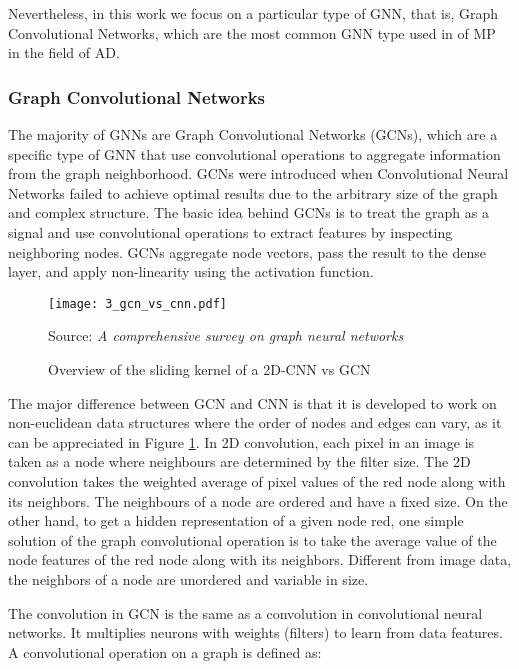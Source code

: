 Nevertheless, in this work we focus on a particular type of GNN, that is, Graph Convolutional Networks, which are the most common GNN type used in of \ac{MP} in the field of \ac{AD}.

\subsubsection{Graph Convolutional Networks}
\label{subsubsec:3_gcns}

The majority of GNNs are Graph Convolutional Networks (GCNs), which are a specific type of GNN that use convolutional operations to aggregate information from the graph neighborhood. GCNs were introduced when Convolutional Neural Networks failed to achieve optimal results due to the arbitrary size of the graph and complex structure. The basic idea behind GCNs is to treat the graph as a signal and use convolutional operations to extract features by inspecting neighboring nodes. GCNs aggregate node vectors, pass the result to the dense layer, and apply non-linearity using the activation function. 

\begin{figure}[h]
	\centering
	\texttt{[image: 3\_gcn\_vs\_cnn.pdf]}
	\caption{Overview of the sliding kernel of a 2D-CNN vs GCN}
	Source: \textit{A comprehensive survey on graph neural networks} \cite{wu2020comprehensive}
	\label{fig:3_gcn_vs_cnn}
\end{figure}

The major difference between GCN and CNN is that it is developed to work on non-euclidean data structures where the order of nodes and edges can vary, as it can be appreciated in Figure \ref{fig:3_gcn_vs_cnn}. In 2D convolution, each pixel in an image is taken as a node where neighbours are determined by the filter size. The 2D convolution takes the weighted average of pixel values of the red node along with its neighbors. The neighbours of a node are ordered and have a fixed size. On the other hand, to get a hidden representation of a given node red, one simple solution of the graph convolutional operation is to take the average value of the node features of the red node along with its neighbors. Different from image data, the neighbors of a node are unordered and variable in size.

The convolution in GCN is the same as a convolution in convolutional neural networks. It multiplies neurons with weights (filters) to learn from data features. A convolutional operation on a graph is defined as:

